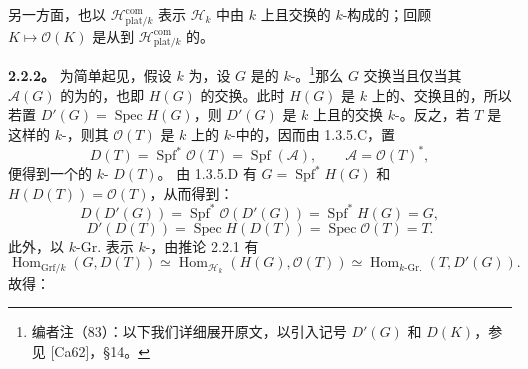 另一方面，也以 $\mathscr H^{\mathrm{com}}_{\mathrm{plat}/k}$ 表示 $\mathscr H_k$ 中由 $k$ 上且交换的 $k$-构成的；回顾 $K\mapsto\mathscr O(K)$ 是从到 $\mathscr H^{\mathrm{com}}_{\mathrm{plat}/k}$ 的。

\textbf{2.2.2。} 为简单起见，假设 $k$ 为，设 $G$ 是的 $k$-。\footnote{编者注（83）：以下我们详细展开原文，以引入记号 $D'(G)$ 和 $D(K)$，参见 [Ca62]，§14。}那么 $G$ 交换当且仅当其 $\mathscr A(G)$ 的为的，也即 $H(G)$ 的交换。此时 $H(G)$ 是 $k$ 上的、交换且的，所以若置 $D'(G)=\operatorname{Spec}H(G)$，则 $D'(G)$ 是 $k$ 上且的交换 $k$-。反之，若 $T$ 是这样的 $k$-，则其 $\mathscr O(T)$ 是 $k$ 上的 $k$-中的，因而由 1.3.5.C，置
\[
D(T)=\operatorname{Spf}^*\mathscr O(T)=\operatorname{Spf}(\mathscr A),
\qquad\mathscr A=\mathscr O(T)^*,
\]
便得到一个的 $k$- $D(T)$。
由 1.3.5.D 有 $G=\operatorname{Spf}^*H(G)$ 和 $H(D(T))=\mathscr O(T)$，从而得到：
\[
D(D'(G))=\operatorname{Spf}^*\mathscr O(D'(G))=\operatorname{Spf}^*H(G)=G,
\]
\[
D'(D(T))=\operatorname{Spec}H(D(T))=\operatorname{Spec}\mathscr O(T)=T.
\]
此外，以 $k\text{-}\mathrm{Gr.}$ 表示 $k$-，由推论 2.2.1 有
\[
\operatorname{Hom}_{\mathrm{Grf}/k}(G,D(T))\simeq\operatorname{Hom}_{\mathscr H_k}(H(G),\mathscr O(T))\simeq\operatorname{Hom}_{k\text{-}\mathrm{Gr.}}(T,D'(G)).
\]
故得：

